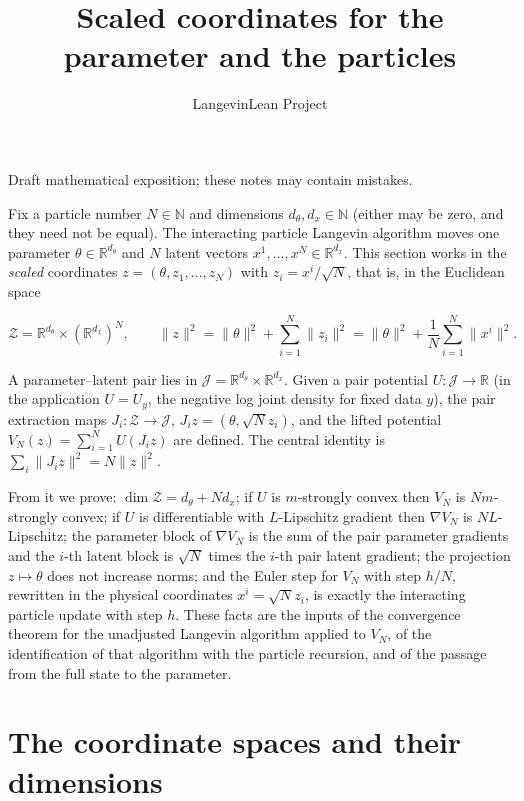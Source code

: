 \documentclass[11pt,a4paper]{article}
\title{\texorpdfstring{Scaled coordinates for the parameter and the particles}{Scaled coordinates for the parameter and the particles}}
\author{LangevinLean Project}
\date{}
\begin{document}
\maketitle
Draft mathematical exposition; these notes may contain mistakes.


Fix a particle number \(N\in\mathbb N\) and dimensions \(d_\theta,d_x\in\mathbb N\) (either may be zero, and they need not be equal). The interacting particle Langevin algorithm moves one parameter \(\theta\in\mathbb R^{d_\theta}\) and \(N\) latent vectors \(x^1,\dots,x^N\in\mathbb R^{d_x}\). This section works in the \emph{scaled} coordinates \(z=(\theta,z_1,\dots,z_N)\) with \(z_i=x^i/\sqrt N\), that is, in the Euclidean space


\[\mathcal Z=\mathbb R^{d_\theta}\times(\mathbb R^{d_x})^N,\qquad \|z\|^2=\|\theta\|^2+\sum_{i=1}^N\|z_i\|^2=\|\theta\|^2+\frac1N\sum_{i=1}^N\|x^i\|^2 .\]


A parameter–latent pair lies in \(\mathcal J=\mathbb R^{d_\theta}\times\mathbb R^{d_x}\). Given a pair potential \(U:\mathcal J\to\mathbb R\) (in the application \(U=U_y\), the negative log joint density for fixed data \(y\)), the pair extraction maps \(J_i:\mathcal Z\to\mathcal J\), \(J_iz=(\theta,\sqrt N z_i)\), and the lifted potential \(V_N(z)=\sum_{i=1}^NU(J_iz)\) are defined. The central identity is \(\sum_i\|J_iz\|^2=N\|z\|^2\).




From it we prove: \(\dim\mathcal Z=d_\theta+Nd_x\); if \(U\) is \(m\)-strongly convex then \(V_N\) is \(Nm\)-strongly convex; if \(U\) is differentiable with \(L\)-Lipschitz gradient then \(\nabla V_N\) is \(NL\)-Lipschitz; the parameter block of \(\nabla V_N\) is the sum of the pair parameter gradients and the \(i\)-th latent block is \(\sqrt N\) times the \(i\)-th pair latent gradient; the projection \(z\mapsto\theta\) does not increase norms; and the Euler step for \(V_N\) with step \(h/N\), rewritten in the physical coordinates \(x^i=\sqrt Nz_i\), is exactly the interacting particle update with step \(h\). These facts are the inputs of the convergence theorem for the unadjusted Langevin algorithm applied to \(V_N\), of the identification of that algorithm with the particle recursion, and of the passage from the full state to the parameter.


\section{\texorpdfstring{The coordinate spaces and their dimensions}{The coordinate spaces and their dimensions}}
\end{document}
